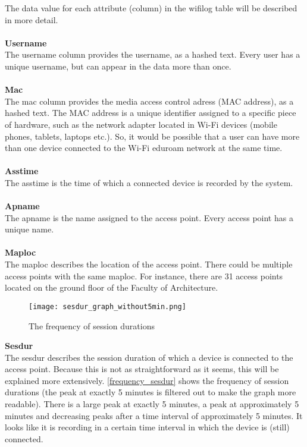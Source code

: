 The data value for each attribute (column) in the wifilog table will be described in more detail.\\\\
\textbf{Username}\\
The username column provides the username, as a hashed text. Every user has a unique username, but can appear in the data more than once.
\\\\
\textbf{Mac}\\
The mac column provides the media access control adress (MAC address), as a hashed text. The MAC address is a unique identifier assigned to a specific piece of hardware, such as the network adapter located in Wi-Fi devices (mobile phones, tablets, laptops etc.). So, it would be possible that a user can have more than one device connected to the Wi-Fi eduroam network at the same time.
\\\\
\textbf{Asstime}\\
The asstime is the time of which a connected device is recorded by the system.
\\\\
\textbf{Apname}\\
The apname is the name assigned to the access point. Every access point has a unique name. 
\\\\
\textbf{Maploc}\\
The maploc describes the location of the access point. There could be multiple access points with the same maploc. For instance, there are 31 access points located on the ground floor of the Faculty of Architecture.\\
\begin{figure}[H]
	\centering
	\texttt{[image: sesdur\_graph\_without5min.png]}
	\captionsetup{justification=centering}
	\caption{The frequency of session durations}
	\label{frequency_sesdur}
\end{figure}
\textbf{Sesdur}\\
The sesdur describes the session duration of which a device is connected to the access point. Because this is not as straightforward as it seems, this will be explained more extensively. \autoref{frequency_sesdur} shows the frequency of session durations (the peak at exactly 5 minutes is filtered out to make the graph more readable). There is a large peak at exactly 5 minutes, a peak at approximately 5 minutes and decreasing peaks after a time interval of approximately 5 minutes. It looks like it is recording in a certain time interval in which the device is (still) connected. \\\\
